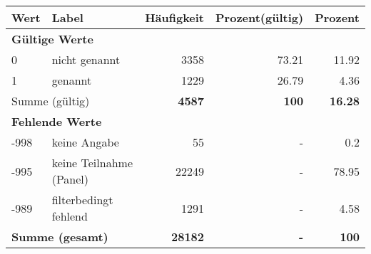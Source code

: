      \begin{longtable}{lXrrr}
     \toprule
     \textbf{Wert} & \textbf{Label} & \textbf{Häufigkeit} & \textbf{Prozent(gültig)} & \textbf{Prozent} \\
     \endhead
     \midrule
     \multicolumn{5}{l}{\textbf{Gültige Werte}}\\

     0 &
     \multicolumn{1}{X}{ nicht genannt   } &


       \num{3358} &
       \num[round-mode=places,round-precision=2]{73.21} &
         \num[round-mode=places,round-precision=2]{11.92} \\

     1 &
     \multicolumn{1}{X}{ genannt   } &


       \num{1229} &
       \num[round-mode=places,round-precision=2]{26.79} &
         \num[round-mode=places,round-precision=2]{4.36} \\
     \midrule
     \multicolumn{2}{l}{Summe (gültig)} &
       \textbf{\num{4587}} &
     \textbf{\num{100}} &
       \textbf{\num[round-mode=places,round-precision=2]{16.28}} \\
     \multicolumn{5}{l}{\textbf{Fehlende Werte}}\\
       -998 &
       keine Angabe &
         \num{55} &
        - &
         \num[round-mode=places,round-precision=2]{0.2} \\
       -995 &
       keine Teilnahme (Panel) &
         \num{22249} &
        - &
         \num[round-mode=places,round-precision=2]{78.95} \\
       -989 &
       filterbedingt fehlend &
         \num{1291} &
        - &
         \num[round-mode=places,round-precision=2]{4.58} \\
     \midrule
     \multicolumn{2}{l}{\textbf{Summe (gesamt)}} &
          \textbf{\num{28182}} &
        \textbf{-} &
        \textbf{\num{100}} \\
     \bottomrule
     \end{longtable}
     
